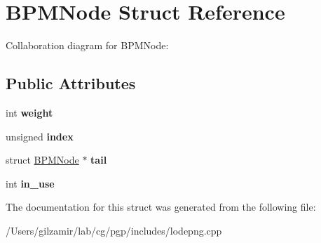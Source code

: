 \hypertarget{struct_b_p_m_node}{}\section{B\+P\+M\+Node Struct Reference}
\label{struct_b_p_m_node}


Collaboration diagram for B\+P\+M\+Node\+:
\subsection*{Public Attributes}
\begin{DoxyCompactItemize}
\item 
\mbox{\label{struct_b_p_m_node_a349ff0204b52858db88a47940509f14e}} 
int {\bfseries weight}
\item 
\mbox{\label{struct_b_p_m_node_a8a77213810f8e491f8d1f7d8793b641f}} 
unsigned {\bfseries index}
\item 
\mbox{\label{struct_b_p_m_node_a03f3ca43fe1eb8bee70592ebff763934}} 
struct \mbox{\hyperlink{struct_b_p_m_node}{B\+P\+M\+Node}} $\ast$ {\bfseries tail}
\item 
\mbox{\label{struct_b_p_m_node_ae0117b99903b29d19f41e0c242c25dca}} 
int {\bfseries in\+\_\+use}
\end{DoxyCompactItemize}


The documentation for this struct was generated from the following file\+:\begin{DoxyCompactItemize}
\item 
/\+Users/gilzamir/lab/cg/pgp/includes/lodepng.\+cpp\end{DoxyCompactItemize}
